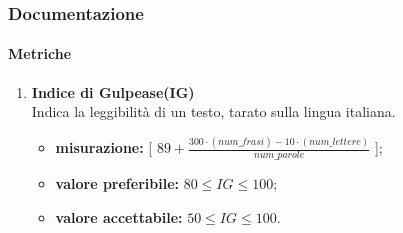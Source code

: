 	\subsubsection{Documentazione}
		\paragraph{Metriche}
		\begin{enumerate}
		\item[]
			\textbf{Indice di Gulpease(IG)}\\
			Indica la leggibilità di un testo, tarato sulla lingua italiana.
			\begin{itemize} %
				\item \textbf{misurazione:} [ $89+ \frac{300\cdot (num\_frasi) - 10\cdot (num\_lettere)}{num\_parole}$ ];
				\item \textbf{valore preferibile:} $80\leq IG\leq 100$;
				\item \textbf{valore accettabile:} $50\leq IG\leq 100$.
			\end{itemize}
		\end{enumerate}
\pagebreak
